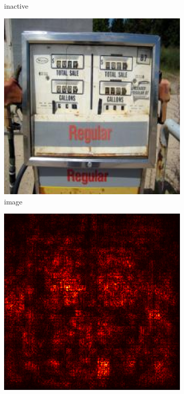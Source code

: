 \documentclass[preprint,12pt]{elsarticle}
\begin{document}
\begin{figure}
\begin{subfigure}{0.14\textwidth}
        \caption{inactive}
    \end{subfigure}
    \hfill
    \begin{subfigure}{0.14\linewidth}
        \centering
        \includegraphics[width=\linewidth]{../visualizations/examples/imagenette/resnet18/images/9.png}
        \caption{image}
    \end{subfigure}
    \hfill
    \begin{subfigure}{0.14\linewidth}
        \centering
        \includegraphics[width=\linewidth]{../visualizations/examples/imagenette/resnet18/saliency_map/9.png}

\end{subfigure}
\end{figure}
\end{document}
